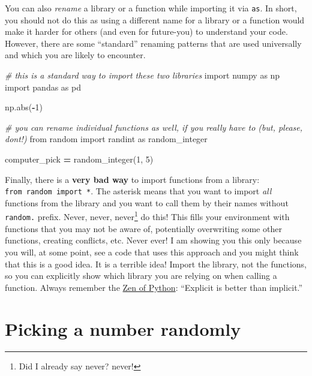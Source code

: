 \documentclass[
]{book}
\newenvironment{Shaded}{\begin{snugshade}}{\end{snugshade}}
\newcommand{\BuiltInTok}[1]{#1}
\newcommand{\CommentTok}[1]{\textcolor[rgb]{0.56,0.35,0.01}{\textit{#1}}}
\newcommand{\DecValTok}[1]{\textcolor[rgb]{0.00,0.00,0.81}{#1}}
\newcommand{\ImportTok}[1]{#1}
\newcommand{\NormalTok}[1]{#1}
\newcommand{\OperatorTok}[1]{\textcolor[rgb]{0.81,0.36,0.00}{\textbf{#1}}}
\begin{document}
You can also \emph{rename} a library or a function while importing it via \texttt{as}. In short, you should not do this as using a different name for a library or a function would make it harder for others (and even for future-you) to understand your code. However, there are some ``standard'' renaming patterns that are used universally and which you are likely to encounter.

\begin{Shaded}
\begin{Highlighting}[]
\CommentTok{\# this is a standard way to import these two libraries}
\ImportTok{import}\NormalTok{ numpy }\ImportTok{as}\NormalTok{ np}
\ImportTok{import}\NormalTok{ pandas }\ImportTok{as}\NormalTok{ pd}

\NormalTok{np.}\BuiltInTok{abs}\NormalTok{(}\OperatorTok{{-}}\DecValTok{1}\NormalTok{)}

\CommentTok{\# you can rename individual functions as well, if you really have to (but, please, don\textquotesingle{}t!)}
\ImportTok{from}\NormalTok{ random }\ImportTok{import}\NormalTok{ randint }\ImportTok{as}\NormalTok{ random\_integer}

\NormalTok{computer\_pick }\OperatorTok{=}\NormalTok{ random\_integer(}\DecValTok{1}\NormalTok{, }\DecValTok{5}\NormalTok{)}
\end{Highlighting}
\end{Shaded}

Finally, there is a \textbf{very bad way} to import functions from a library: \texttt{from\ random\ import\ *}. The asterisk means that you want to import \emph{all} functions from the library and you want to call them by their names without \texttt{random.} prefix. Never, never, never\footnote{Did I already say never? never!} do this! This fills your environment with functions that you may not be aware of, potentially overwriting some other functions, creating conflicts, etc. Never ever! I am showing you this only because you will, at some point, see a code that uses this approach and you might think that this is a good idea. It is a terrible idea! Import the library, not the functions, so you can explicitly show which library you are relying on when calling a function. Always remember the \href{https://www.python.org/dev/peps/pep-0020/}{Zen of Python}: ``Explicit is better than implicit.''

\hypertarget{picking-a-number-randomly}{%
\section{Picking a number randomly}\label{picking-a-number-randomly}}
\end{document}
